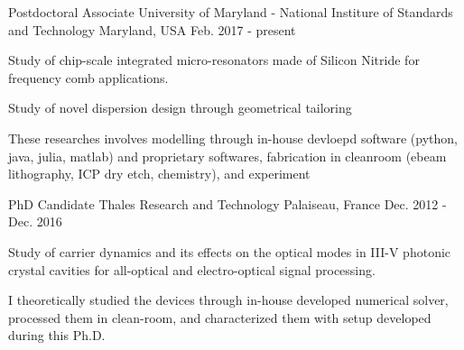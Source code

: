 \documentclass[11pt, letterpaper]{awesome-cv}
\begin{document}
\begin{cventries}%
%
\cventry
    {Postdoctoral Associate} %
    {University of Maryland - National Institure of Standards and Technology} %
    {Maryland, USA} %
    {Feb. 2017 - present} %
    {
      \begin{cvitems} %
        \item {Study of chip-scale integrated micro-resonators made of Silicon Nitride for frequency comb applications.}
        \item{Study of novel dispersion design through geometrical tailoring}
        \item{These researches involves modelling through in-house devloepd software (python, java, julia, matlab) and proprietary softwares, fabrication in cleanroom (ebeam lithography, ICP dry etch, chemistry), and experiment}
      \end{cvitems}
    }
\cventry
    {PhD Candidate} %
    {Thales Research and Technology} %
    {Palaiseau, France} %
    {Dec. 2012 - Dec. 2016} %
    {
      \begin{cvitems} %
        \item {Study of carrier dynamics and its effects on the optical modes in III-V photonic crystal cavities for all-optical
        and electro-optical signal processing.}
        \item {I theoretically studied the devices through in-house developed numerical solver, processed them in clean-room, and characterized them with setup developed during this Ph.D.}
      \end{cvitems}
    }
\end{cventries}
\end{document}
